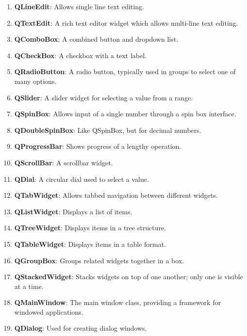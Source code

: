 \documentclass{report}
\begin{document}
    \pagebreak 
    \begin{enumerate}[label=\textbf{\arabic*.}]
        \item \textbf{QLineEdit}: Allows single line text editing.
        \item \textbf{QTextEdit}: A rich text editor widget which allows multi-line text editing.
        \item \textbf{QComboBox}: A combined button and dropdown list.
        \item \textbf{QCheckBox}: A checkbox with a text label.
        \item \textbf{QRadioButton}: A radio button, typically used in groups to select one of many options.
        \item \textbf{QSlider}: A slider widget for selecting a value from a range.
        \item \textbf{QSpinBox}: Allows input of a single number through a spin box interface.
        \item \textbf{QDoubleSpinBox}: Like QSpinBox, but for decimal numbers.
        \item \textbf{QProgressBar}: Shows progress of a lengthy operation.
        \item \textbf{QScrollBar}: A scrollbar widget.
        \item \textbf{QDial}: A circular dial used to select a value.
        \item \textbf{QTabWidget}: Allows tabbed navigation between different widgets.
        \item \textbf{QListWidget}: Displays a list of items.
        \item \textbf{QTreeWidget}: Displays items in a tree structure.
        \item \textbf{QTableWidget}: Displays items in a table format.
        \item \textbf{QGroupBox}: Groups related widgets together in a box.
        \item \textbf{QStackedWidget}: Stacks widgets on top of one another; only one is visible at a time.
        \item \textbf{QMainWindow}: The main window class, providing a framework for windowed applications.
        \item \textbf{QDialog}: Used for creating dialog windows.
    \end{enumerate}
\end{document}
